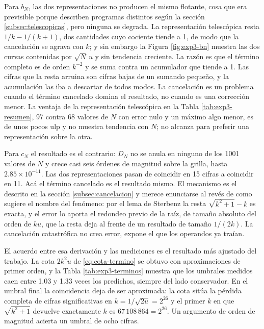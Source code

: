 Para $b_N$, las dos representaciones no producen el mismo flotante, cosa que era previsible porque
describen programas distintos según la sección \ref{subsec:telescopicas}, pero ninguna se degrada.
La representación telescópica resta $1/k - 1/(k+1)$, dos cantidades cuyo cociente tiende a 1, de modo que la
cancelación se agrava con $k$; y sin embargo la Figura \ref{fig:exp3-bn} muestra las dos curvas
contenidas por $\sqrt{N}\,u$ y sin tendencia creciente. La razón es que el término completo es de
orden $k^{-2}$ y se suma contra un acumulador que tiende a 1. Las cifras que la resta arruina son
cifras bajas de un sumando pequeño, y la acumulación las iba a descartar de todos modos. La
cancelación es un problema cuando el término cancelado domina el resultado, no cuando es una
corrección menor. La ventaja de la representación telescópica en la Tabla \ref{tab:exp3-resumen}, 97 contra
68 valores de $N$ con error nulo y un máximo algo menor, es de unos pocos ulp y no muestra tendencia
con $N$; no alcanza para preferir una representación sobre la otra.

Para $c_N$ el resultado es el contrario: $D_N$ no se anula en ninguno de los 1001 valores de $N$ y
crece casi seis órdenes de magnitud sobre la grilla, hasta $2.85 \times 10^{-11}$. Las dos
representaciones pasan de coincidir en 15 cifras a coincidir en 11. Acá el término cancelado es el
resultado mismo. El mecanismo es el descrito en la sección \ref{subsec:cancelacion} y merece
enunciarse al revés de como sugiere el nombre del fenómeno: por el lema de Sterbenz la resta
$\sqrt{k^{2}+1} - k$ es exacta, y el error lo aporta el redondeo previo de la raíz, de tamaño
absoluto del orden de $ku$, que la resta deja al frente de un resultado de tamaño $1/(2k)$. La
cancelación catastrófica no crea error, expone el que los operandos ya traían.

El acuerdo entre esa derivación y las mediciones es el resultado más ajustado del trabajo. La cota
$2k^{2}u$ de \eqref{eq:cota-termino} se obtuvo con aproximaciones de primer orden, y la Tabla
\ref{tab:exp3-terminos} muestra que los umbrales medidos caen entre 1.03 y 1.33 veces los
predichos, siempre del lado conservador. En el umbral final la coincidencia deja de ser aproximada:
la cota sitúa la pérdida completa de cifras significativas en $k = 1/\sqrt{2u} = 2^{26}$ y el primer
$k$ en que $\sqrt{k^{2}+1}$ devuelve exactamente $k$ es $67\,108\,864 = 2^{26}$. Un argumento de
orden de magnitud acierta un umbral de ocho cifras.

